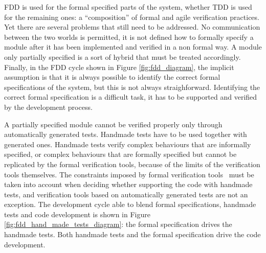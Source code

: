 \documentclass[english]{lni}
\begin{document}
FDD is used for the formal specified parts of the system, whether TDD is used for the remaining ones: a ``composition'' of formal and agile verification practices.
Yet there are several problems that still need to be addressed.
No communication between the two worlds is permitted, it is not defined how to formally specify a module after it has been implemented and verified in a non formal way.
A module only partially specified is a sort of hybrid that must be treated accordingly.
Finally, in the FDD cycle shown in Figure \ref{fig:fdd_diagram}, the implicit assumption is that it is always possible to identify the correct formal specifications of the system, but this is not always straighforward.
Identifying the correct formal specification is a difficult task, it has to be supported and verified by the development process.

A partially specified module cannot be verified properly only through automatically generated tests.
Handmade tests have to be used together with generated ones.
Handmade tests verify complex behaviours that are informally specified, or complex behaviours that are formally specified but cannot be replicated by the formal verification tools, because of the limits of the verification tools themselves. 
The constraints imposed by formal verification tools~\cite{Glass2002} must be taken into account when deciding whether supporting the code with handmade tests, and verification tools based on automatically generated tests are not an exception.
The development cycle able to blend formal specifications, handmade tests and code development is shown in Figure \ref{fig:fdd_hand_made_tests_diagram}: the formal specification drives the handmade tests. 
Both handmade tests and the formal specification drive the code development.
\end{document}
